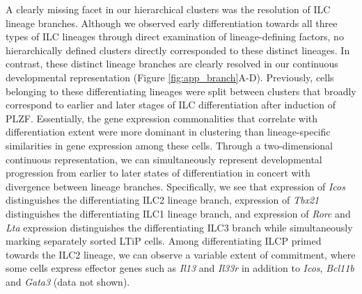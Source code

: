 \begin{subappendices}
A clearly missing facet in our hierarchical clusters was the resolution of ILC lineage branches. Although we observed early differentiation towards all three types of ILC lineages through direct examination of lineage-defining factors, no hierarchically defined clusters directly corresponded to these distinct lineages. In contrast, these distinct lineage branches are clearly resolved in our continuous developmental representation (Figure \ref{fig:app_branch}A-D). Previously, cells belonging to these differentiating lineages were split between clusters that broadly correspond to earlier and later stages of ILC differentiation after induction of PLZF. Essentially, the gene expression commonalities that correlate with differentiation extent were more dominant in clustering than lineage-specific similarities in gene expression among these cells. Through a two-dimensional continuous representation, we can simultaneously represent developmental progression from earlier to later states of differentiation in concert with divergence between lineage branches. Specifically, we see that expression of \textit{Icos} distinguishes the differentiating ILC2 lineage branch, expression of \textit{Tbx21} distinguishes the differentiating ILC1 lineage branch, and expression of \textit{Rorc} and \textit{Lta} expression distinguishes the differentiating ILC3 branch while simultaneously marking separately sorted LTiP cells. Among differentiating ILCP primed towards the ILC2 lineage, we can observe a variable extent of commitment, where some cells express effector genes such as \textit{Il13} and \textit{Il33r} in addition to \textit{Icos}, \textit{Bcl11b} and \textit{Gata3} (data not shown).


\end{subappendices}
